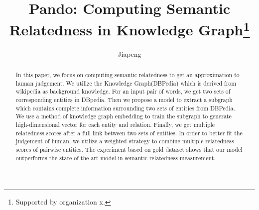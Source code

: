 \documentclass[runningheads]{llncs}
\begin{document}
  \title{Pando: Computing Semantic Relatedness in Knowledge Graph\thanks{Supported by organization x.}}
  \author{Jiapeng }
  
  \maketitle              %
  \begin{abstract}
    In this paper, we focus on computing semantic relatedness to get an approximation to human judgement.
    We utilize the Knowledge Graph(DBPedia) which is derived from wikipedia as background knowledge.
    For an input pair of words, we get two sets of corresponding entities in DBpedia.
    Then we propose a model to extract a subgraph which contains complete information surrounding two sets of entities from DBPedia.
    We use a method of knowledge graph embedding to train the subgraph to generate high-dimensional vector for each entity and relation. 
    Finally, we get multiple relatedness scores after a full link between two sets of entities.
    In order to better fit the judgement of human, we utilize a weighted strategy to combine
    multiple relatedness scores of pairwise entities.
    The experiment based on gold dataset shows that our model outperforms the state-of-the-art model in semantic relatedness measurement.
  
  \end{abstract}
  
  
  
  
  

  
  
  
\end{document}
